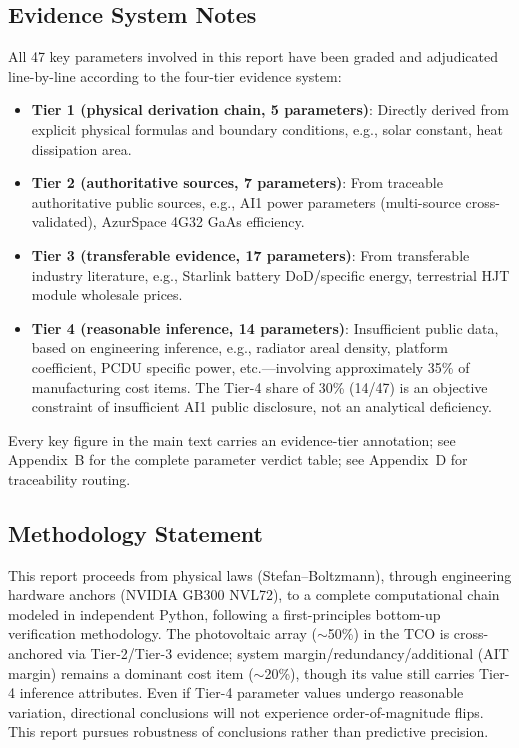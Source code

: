 \subsection*{Evidence System Notes}

All 47 key parameters involved in this report have been graded and adjudicated line-by-line according to the four-tier evidence system:

\begin{itemize}[leftmargin=*]
    \item \textbf{Tier 1 (physical derivation chain, 5 parameters)}: Directly derived from explicit physical formulas and boundary conditions, e.g., solar constant, heat dissipation area.
    \item \textbf{Tier 2 (authoritative sources, 7 parameters)}: From traceable authoritative public sources, e.g., AI1 power parameters (multi-source cross-validated), AzurSpace 4G32 GaAs efficiency.
    \item \textbf{Tier 3 (transferable evidence, 17 parameters)}: From transferable industry literature, e.g., Starlink battery DoD/specific energy, terrestrial HJT module wholesale prices.
    \item \textbf{Tier 4 (reasonable inference, 14 parameters)}: Insufficient public data, based on engineering inference, e.g., radiator areal density, platform coefficient, PCDU specific power, etc.---involving approximately 35\% of manufacturing cost items. The Tier-4 share of 30\% (14/47) is an objective constraint of insufficient AI1 public disclosure, not an analytical deficiency.
\end{itemize}

Every key figure in the main text carries an evidence-tier annotation; see Appendix~B for the complete parameter verdict table; see Appendix~D for traceability routing.

\subsection*{Methodology Statement}

This report proceeds from physical laws (Stefan--Boltzmann), through engineering hardware anchors (NVIDIA GB300 NVL72), to a complete computational chain modeled in independent Python, following a first-principles bottom-up verification methodology. The photovoltaic array ($\sim$50\%) in the TCO is cross-anchored via Tier-2/Tier-3 evidence; system margin/redundancy/additional (AIT margin) remains a dominant cost item ($\sim$20\%), though its value still carries Tier-4 inference attributes. Even if Tier-4 parameter values undergo reasonable variation, directional conclusions will not experience order-of-magnitude flips. This report pursues robustness of conclusions rather than predictive precision.

\endinput
